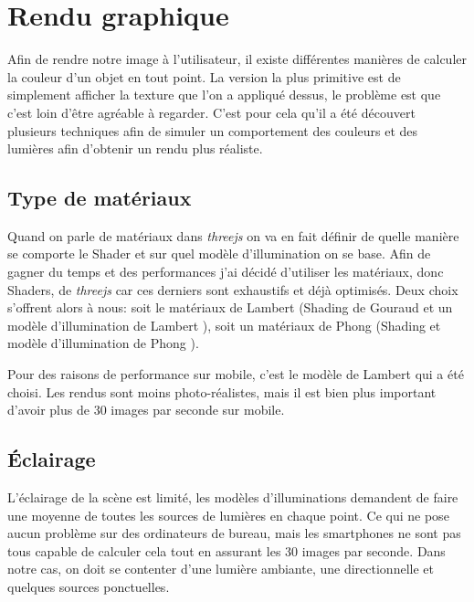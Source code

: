 \section{Rendu graphique}
Afin de rendre notre image à l'utilisateur, il existe différentes manières de calculer la couleur d'un objet en tout point. La version la plus primitive est de simplement afficher la texture que l'on a appliqué dessus, le problème est que c'est loin d'être agréable à regarder. C'est pour cela qu'il a été découvert plusieurs techniques afin de simuler un comportement des couleurs et des lumières afin d'obtenir un rendu plus réaliste.

\subsection{Type de matériaux}
Quand on parle de matériaux dans \textit{threejs} on va en fait définir de quelle manière se comporte le Shader \cite{wiki-shader} et sur quel modèle d'illumination on se base. Afin de gagner du temps et des performances j'ai décidé d'utiliser les matériaux, donc Shaders, de \textit{threejs} car ces derniers sont exhaustifs et déjà optimisés. Deux choix s'offrent alors à nous: soit le matériaux de Lambert (Shading de Gouraud \cite{wiki-gouraud} et un modèle d'illumination de Lambert \cite{wiki-lambert}), soit un matériaux de Phong (Shading et modèle d'illumination de Phong \cite{wiki-phong-shading} \cite{wiki-phong-reflectance}).

Pour des raisons de performance sur mobile, c'est le modèle de Lambert qui a été choisi. Les rendus sont moins photo-réalistes, mais il est bien plus important d'avoir plus de 30 images par seconde sur mobile.


\subsection{Éclairage}
L'éclairage de la scène est limité, les modèles d'illuminations demandent de faire une moyenne de toutes les sources de lumières en chaque point. Ce qui ne pose aucun problème sur des ordinateurs de bureau, mais les smartphones ne sont pas tous capable de calculer cela tout en assurant les 30 images par seconde. Dans notre cas, on doit se contenter d'une lumière ambiante, une directionnelle et quelques sources ponctuelles. 